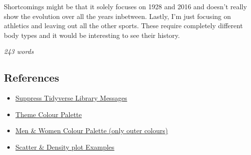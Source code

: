 \documentclass[
]{article}
\begin{document}
Shortcomings might be that it solely focuses on 1928 and 2016 and
doesn't really show the evolution over all the years inbetween. Lastly,
I'm just focusing on athletics and leaving out all the other sports.
These require completely different body types and it would be
interesting to see their history.

\emph{243 words}

\subsection{References}\label{references}

\begin{itemize}
\item
  \href{https://stackoverflow.com/questions/48587115/turn-off-verbose-messages-when-loading-tidyverse-using-library-function}{Suppress
  Tidyverse Library Messages}
\item
  \href{https://colorkit.co/palette/660e60-893f71-ac6f82-cfa093-f3d0a4/}{Theme
  Colour Palette}
\item
  \href{https://colorkit.co/palette/c45161-e094a0-f2b6c0-f2dde1-cbc7d8-8db7d2-5e62a9-434279/}{Men
  \& Women Colour Palette (only outer colours)}
\item
  \href{https://r-graph-gallery.com/2d-density-plot-with-ggplot2.html}{Scatter
  \& Density plot Examples}
\end{itemize}
\end{document}
